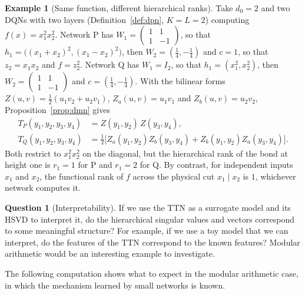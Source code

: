 \documentclass[11pt]{article}
\theoremstyle{definition}
\newtheorem{example}[theorem]{Example}
\newtheorem{question}[theorem]{Question}
\numberwithin{equation}{section}
\begin{document}
\begin{example}[Same function, different hierarchical ranks]\label{ex:same-function}
Take $d_0=2$ and two DQNs with two layers (Definition~\ref{def:dpn}, $K=L=2$) computing $f(x)=x_1^2x_2^2$. Network P has $W_1=\left(\begin{smallmatrix}1&1\\1&-1\end{smallmatrix}\right)$, so that $h_1=\big((x_1+x_2)^2,(x_1-x_2)^2\big)$, then $W_2=(\tfrac14,-\tfrac14)$ and $c=1$, so that $z_2=x_1x_2$ and $f=z_2^2$. Network Q has $W_1=I_2$, so that $h_1=(x_1^2,x_2^2)$, then $W_2=\left(\begin{smallmatrix}1&1\\1&-1\end{smallmatrix}\right)$ and $c=(\tfrac14,-\tfrac14)$. With the bilinear forms $Z(u,v)=\tfrac12(u_1v_2+u_2v_1)$, $Z_a(u,v)=u_1v_1$ and $Z_b(u,v)=u_2v_2$, Proposition~\ref{prop:dmn} gives
\begin{align*}
T_P(y_1,y_2,y_3,y_4)&=Z(y_1,y_2)\,Z(y_3,y_4),\\
T_Q(y_1,y_2,y_3,y_4)&=\tfrac12\big[Z_a(y_1,y_2)Z_b(y_3,y_4)+Z_b(y_1,y_2)Z_a(y_3,y_4)\big].
\end{align*}
Both restrict to $x_1^2x_2^2$ on the diagonal, but the hierarchical rank of the bond at height one is $r_1=1$ for P and $r_1=2$ for Q. By contrast, for independent inputs $x_1$ and $x_2$, the functional rank of $f$ across the physical cut $x_1\mid x_2$ is $1$, whichever network computes it.
\end{example}

\begin{question}[Interpretability]\label{q:interpretability}
If we use the TTN as a surrogate model and its HSVD to interpret it, do the hierarchical singular values and vectors correspond to some meaningful structure? For example, if we use a toy model that we can interpret, do the features of the TTN correspond to the known features? Modular arithmetic would be an interesting example to investigate.
\end{question}

The following computation shows what to expect in the modular arithmetic case, in which the mechanism learned by small networks is known.
\end{document}
